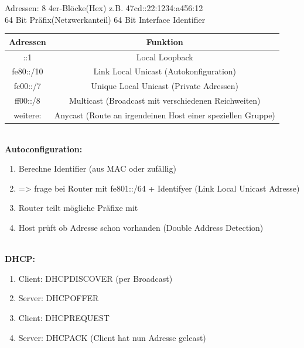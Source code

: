 Adressen: 8 4er-Blöcke(Hex) z.B. 47cd::22:1234:a456:12 \\
64 Bit Präfix(Netzwerkanteil) 64 Bit Interface Identifier\\
\begin{tabular}{|c|c|}
\hline
Adressen & Funktion \\ \hline
::1 		& Local Loopback \\ \hline
fe80::/10 	& Link Local Unicast (Autokonfiguration) \\ \hline
fc00::/7	& Unique Local Unicast (Private Adressen) \\ \hline
ff00::/8	& Multicast (Broadcast mit verschiedenen Reichweiten) \\ \hline
weitere:	& Anycast (Route an irgendeinen Host einer speziellen Gruppe) \\ \hline
\end{tabular}\\

\textbf{Autoconfiguration: }\\
\begin{minipage}{0.5\textwidth}
\begin{enumerate}
\item Berechne Identifier (aus MAC oder zufällig)
\item => frage bei Router mit fe801::/64 + Identifyer (Link Local Unicast Adresse)
\item Router teilt mögliche Präfixe mit
\item Host prüft ob Adresse schon vorhanden (Double Address Detection)
\end{enumerate}
\end{minipage}\\


\textbf{DHCP: }\\
\begin{minipage}{0.5\textwidth}
\begin{enumerate}
\item Client: DHCPDISCOVER (per Broadcast)
\item Server: DHCPOFFER 
\item Client: DHCPREQUEST
\item Server: DHCPACK (Client hat nun Adresse geleast)
\end{enumerate}
\end{minipage}
\clearpage




